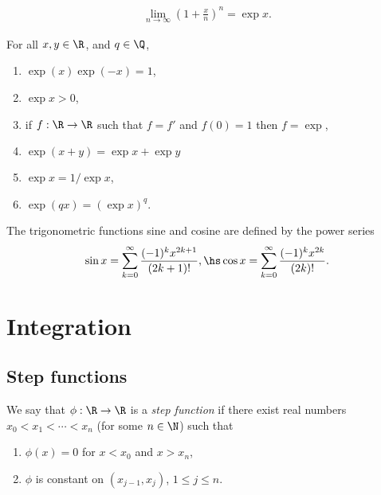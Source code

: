 \documentclass{article}
\begin{document}
\begin{corollary*}
	\begin{align*}
		\lim_{n\to\infty}\left(1+\frac{x}{n}\right)^n = \exp x.
	\end{align*}	
\end{corollary*}

\begin{theorem}
	For all $x,y\in\R$, and $q\in\Q$,
	\begin{enumerate}
		\item $\exp(x)\exp(-x)=1$,
		\item $\exp x > 0$,
		\item if $f:\R\to\R$ such that $f=f'$ and $f(0)=1$ then $f=\exp$,
		\item $\exp(x+y)=\exp x + \exp y$
		\item $\exp x = 1/\exp x$,
		\item $\exp (qx) = (\exp x)^q$.
	\end{enumerate}
\end{theorem}

\begin{definition}
	The trigonometric functions sine and cosine are defined by the power series 
	\begin{align*}
		\sin x = \sum_{k=0}^\infty \frac{(-1)^k x^{2k+1}}{(2k+1)!},\hs
		\cos x = \sum_{k=0}^\infty \frac{(-1)^k x^{2k}}{(2k)!}.
	\end{align*}
\end{definition}

\section{Integration}

\subsection{Step functions}

\begin{definition}
	We say that $\phi:\R\to\R$ is a \emph{step function} if there exist real numbers
	$x_0<x_1<\cdots < x_n$ (for some $n\in\N$) such that
	\begin{enumerate}
		\item $\phi(x)=0$ for $x<x_0$ and $x>x_n$,
		\item $\phi$ is constant on $(x_{j-1}, x_j)$, $1\leq j\leq n$.
	\end{enumerate}
\end{definition}
\end{document}
